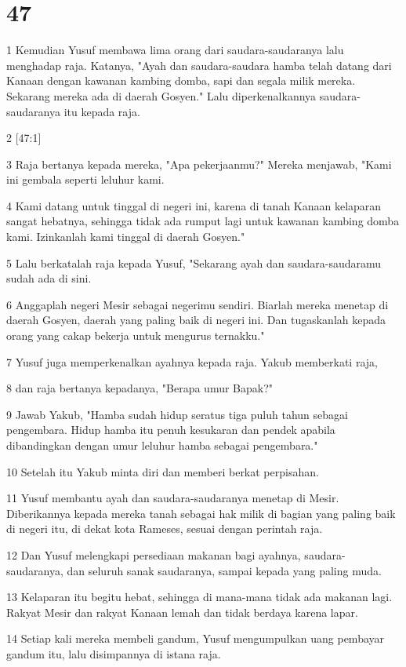 \chapter{47}

\par 1 Kemudian Yusuf membawa lima orang dari saudara-saudaranya lalu menghadap raja. Katanya, "Ayah dan saudara-saudara hamba telah datang dari Kanaan dengan kawanan kambing domba, sapi dan segala milik mereka. Sekarang mereka ada di daerah Gosyen." Lalu diperkenalkannya saudara-saudaranya itu kepada raja.
\par 2 [47:1]
\par 3 Raja bertanya kepada mereka, "Apa pekerjaanmu?" Mereka menjawab, "Kami ini gembala seperti leluhur kami.
\par 4 Kami datang untuk tinggal di negeri ini, karena di tanah Kanaan kelaparan sangat hebatnya, sehingga tidak ada rumput lagi untuk kawanan kambing domba kami. Izinkanlah kami tinggal di daerah Gosyen."
\par 5 Lalu berkatalah raja kepada Yusuf, "Sekarang ayah dan saudara-saudaramu sudah ada di sini.
\par 6 Anggaplah negeri Mesir sebagai negerimu sendiri. Biarlah mereka menetap di daerah Gosyen, daerah yang paling baik di negeri ini. Dan tugaskanlah kepada orang yang cakap bekerja untuk mengurus ternakku."
\par 7 Yusuf juga memperkenalkan ayahnya kepada raja. Yakub memberkati raja,
\par 8 dan raja bertanya kepadanya, "Berapa umur Bapak?"
\par 9 Jawab Yakub, "Hamba sudah hidup seratus tiga puluh tahun sebagai pengembara. Hidup hamba itu penuh kesukaran dan pendek apabila dibandingkan dengan umur leluhur hamba sebagai pengembara."
\par 10 Setelah itu Yakub minta diri dan memberi berkat perpisahan.
\par 11 Yusuf membantu ayah dan saudara-saudaranya menetap di Mesir. Diberikannya kepada mereka tanah sebagai hak milik di bagian yang paling baik di negeri itu, di dekat kota Rameses, sesuai dengan perintah raja.
\par 12 Dan Yusuf melengkapi persediaan makanan bagi ayahnya, saudara-saudaranya, dan seluruh sanak saudaranya, sampai kepada yang paling muda.
\par 13 Kelaparan itu begitu hebat, sehingga di mana-mana tidak ada makanan lagi. Rakyat Mesir dan rakyat Kanaan lemah dan tidak berdaya karena lapar.
\par 14 Setiap kali mereka membeli gandum, Yusuf mengumpulkan uang pembayar gandum itu, lalu disimpannya di istana raja.
